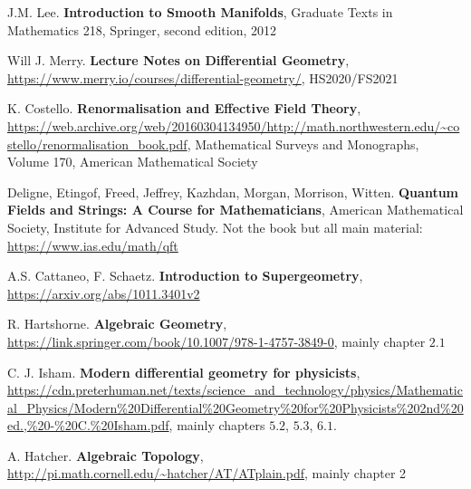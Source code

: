 \begin{thebibliography}{}
	J.M. Lee. \textbf{Introduction to Smooth Manifolds}, Graduate Texts in Mathematics 218, Springer, second edition, 2012\label{Diffgeo_Intro}

	Will J. Merry. \textbf{Lecture Notes on Differential Geometry}, \url{https://www.merry.io/courses/differential-geometry/}, HS2020/FS2021\label{Diffgeo_Merry}

  K. Costello. \textbf{Renormalisation and Effective Field Theory}, \url{https://web.archive.org/web/20160304134950/http://math.northwestern.edu/~costello/renormalisation_book.pdf}, Mathematical Surveys and Monographs, Volume 170, American Mathematical Society\label{Costello}

  Deligne, Etingof, Freed, Jeffrey, Kazhdan, Morgan, Morrison, Witten. \textbf{Quantum Fields and Strings: A Course for Mathematicians}, American Mathematical Society, Institute for Advanced Study. Not the book but all main material: \url{https://www.ias.edu/math/qft}\label{QFStrings}

  A.S. Cattaneo, F. Schaetz. \textbf{Introduction to Supergeometry}, \url{https://arxiv.org/abs/1011.3401v2}\label{IntroSusy}

  R. Hartshorne. \textbf{Algebraic Geometry}, \url{https://link.springer.com/book/10.1007/978-1-4757-3849-0}, mainly chapter $2.1$\label{AlgebraicGeometry}

  C. J. Isham. \textbf{Modern differential geometry for physicists}, \url{https://cdn.preterhuman.net/texts/science_and_technology/physics/Mathematical_Physics/Modern%20Differential%20Geometry%20for%20Physicists%202nd%20ed.,%20-%20C.%20Isham.pdf}, mainly chapters $5.2$, $5.3$, $6.1$.\label{ModernDiffgeo}

  A. Hatcher. \textbf{Algebraic Topology}, \url{http://pi.math.cornell.edu/~hatcher/AT/ATplain.pdf}, mainly chapter 2\label{AlgebraicTopology}


\end{thebibliography}
